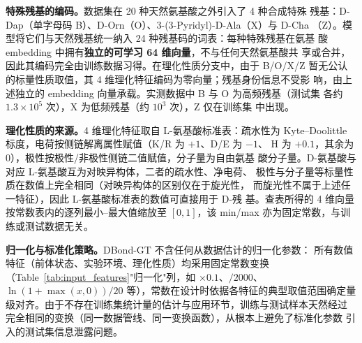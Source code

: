 \textbf{特殊残基的编码。}数据集在 20 种天然氨基酸之外引入了 4 种合成特殊
残基：D-Dap（单字母码 B）、D-Orn（O）、3-(3-Pyridyl)-D-Ala（X）与 D-Cha
（Z）。模型将它们与天然残基统一纳入 24 种残基码的词表：每种特殊残基在氨基
酸 embedding 中拥有\textbf{独立的可学习 64 维向量}，不与任何天然氨基酸共
享或合并，因此其编码完全由训练数据习得。在理化性质分支中，由于 B/O/X/Z
暂无公认的标量性质取值，其 4 维理化特征编码为零向量；残基身份信息不受影
响，由上述独立的 embedding 向量承载。实测数据中 B 与 O 为高频残基（测试集
各约 $1.3\times10^{5}$ 次），X 为低频残基（约 $10^{3}$ 次），Z 仅在训练集
中出现。

\textbf{理化性质的来源。}4 维理化特征取自 L-氨基酸标准表：疏水性为
Kyte--Doolittle 标度，电荷按侧链解离属性赋值（K/R 为 $+1$、D/E 为 $-1$、
H 为 $+0.1$，其余为 0），极性按极性/非极性侧链二值赋值，分子量为自由氨基
酸分子量。D-氨基酸与对应 L-氨基酸互为对映异构体，二者的疏水性、净电荷、
极性与分子量等标量性质在数值上完全相同（对映异构体的区别仅在于旋光性，
而旋光性不属于上述任一特征），因此 L-氨基酸标准表的数值可直接用于 D-残
基。查表所得的 4 维向量按常数表内的逐列最小--最大值缩放至 $[0,1]$，该
min/max 亦为固定常数，与训练或测试数据无关。

\textbf{归一化与标准化策略。}DBond-GT 不含任何从数据估计的归一化参数：
所有数值特征（前体状态、实验环境、理化性质）均采用固定常数变换
（Table~\ref{tab:input_features}"归一化"列，如 $\times0.1$、$/2000$、
$\ln(1+\max(x,0))/20$ 等），常数在设计时依据各特征的典型取值范围确定量
级对齐。由于不存在训练集统计量的估计与应用环节，训练与测试样本天然经过
完全相同的变换（同一数据管线、同一变换函数），从根本上避免了标准化参数
引入的测试集信息泄露问题。

